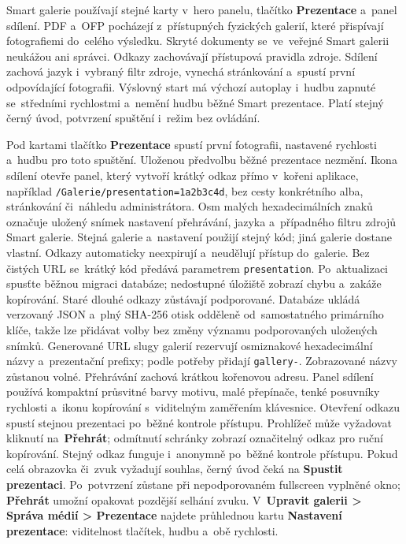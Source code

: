 \documentclass[11pt,a4paper]{article}
\newcommand{\ui}[1]{\textbf{#1}}
\newcommand{\codeword}[1]{\nolinkurl{#1}}
\begin{document}
Smart galerie používají stejné karty v~hero panelu, tlačítko \ui{Prezentace}
a~panel sdílení. PDF a~OFP pocházejí z~přístupných fyzických galerií, které
přispívají fotografiemi do~celého výsledku. Skryté dokumenty se~ve~veřejné
Smart galerii neukážou ani správci. Odkazy zachovávají přístupová pravidla
zdroje.
Sdílení zachová jazyk i~vybraný filtr zdroje, vynechá stránkování a~spustí první
odpovídající fotografii. Výslovný start má výchozí autoplay i~hudbu zapnuté
se~středními rychlostmi a~nemění hudbu běžné Smart prezentace. Platí stejný
černý úvod, potvrzení spuštění i~režim bez ovládání.

Pod kartami tlačítko \ui{Prezentace} spustí první fotografii, nastavené
rychlosti a~hudbu pro toto spuštění. Uloženou předvolbu běžné prezentace
nezmění.
Ikona sdílení otevře panel, který vytvoří krátký odkaz přímo v~kořeni aplikace,
například \codeword{/Galerie/presentation=1a2b3c4d}, bez cesty konkrétního alba,
stránkování či~náhledu administrátora.
Osm malých hexadecimálních znaků označuje uložený snímek nastavení přehrávání,
jazyka a~případného filtru zdrojů Smart galerie. Stejná galerie a~nastavení
použijí stejný kód; jiná galerie dostane vlastní. Odkazy automaticky neexpirují
a~neudělují přístup do~galerie. Bez čistých URL se~krátký kód předává
parametrem \codeword{presentation}. Po~aktualizaci spusťte běžnou migraci
databáze; nedostupné úložiště zobrazí chybu a~zakáže kopírování.
Staré dlouhé odkazy zůstávají podporované. Databáze ukládá verzovaný JSON
a~plný SHA-256 otisk odděleně od~samostatného primárního klíče, takže lze
přidávat volby bez změny významu podporovaných uložených snímků.
Generované URL slugy galerií rezervují osmiznakové hexadecimální názvy
a~prezentační prefixy; podle potřeby přidají \codeword{gallery-}.
Zobrazované názvy zůstanou volné. Přehrávání zachová krátkou kořenovou adresu.
Panel sdílení používá kompaktní průsvitné barvy motivu, malé přepínače,
tenké posuvníky rychlosti a~ikonu kopírování s~viditelným zaměřením klávesnice.
Otevření odkazu spustí stejnou prezentaci po~běžné kontrole přístupu.
Prohlížeč může vyžadovat kliknutí na~\ui{Přehrát}; odmítnutí schránky
zobrazí označitelný odkaz pro ruční kopírování.
Stejný odkaz funguje i~anonymně po~běžné kontrole přístupu.
Pokud celá obrazovka či~zvuk vyžadují souhlas, černý úvod čeká na
\ui{Spustit prezentaci}. Po~potvrzení zůstane při nepodporovaném fullscreen
vyplněné okno; \ui{Přehrát} umožní opakovat pozdější selhání zvuku.
V~\ui{Upravit galerii > Správa médií > Prezentace} najdete průhlednou kartu
\ui{Nastavení prezentace}: viditelnost tlačítek, hudbu a~obě rychlosti.
\end{document}
